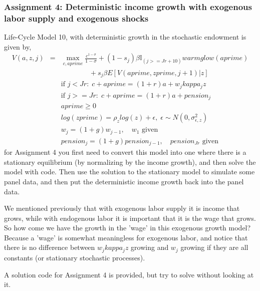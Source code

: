 \subsubsection{Assignment 4: Deterministic income growth with exogenous labor supply and exogenous shocks}
Life-Cycle Model 10, with deterministic growth in the stochastic endowment is given by,
\begin{eqnarray*}
 V(a,z,j)&=& \max_{c,aprime} \frac{c^{1-\sigma}}{1-\sigma}+ (1-s_j)\beta  \mathbb{I}_{(j>=Jr+10)} warmglow(aprime)    \\
 && \quad \quad  \quad \quad  + s_j \beta E[V(aprime,zprime,j+1)|z] \\
&& \text{if }j<Jr: \; c+aprime=(1+r)a+w_j kappa_j z\\
&& \text{if }j>=Jr: \; c+aprime=(1+r)a +pension_j \\
&& aprime\geq 0 \\
&& log(zprime)=\rho_z log(z) + \epsilon, \; \epsilon \sim N(0,\sigma_{\epsilon,z}^2) \\
&& w_j=(1+g) w_{j-1}, \quad w_1\text{ given} \\
&& pension_j=(1+g)pension_{j-1}, \quad pension_{Jr}\text{ given}
\end{eqnarray*}
for Assignment 4 you first need to convert this model into one where there is a stationary equilibrium (by normalizing by the income growth), and then solve the model with code. Then use the solution to the stationary model to simulate some panel data, and then put the deterministic income growth back into the panel data.

We mentioned previously that with exogenous labor supply it is income that grows, while with endogenous labor it is important that it is the wage that grows. So how come we have the growth in the 'wage' in this exogenous growth model? Because a 'wage' is somewhat meaningless for exogenous labor, and notice that there is no difference between $w_j kappa_j z$ growing and $w_j$ growing if they are all constants (or stationary stochastic processes).

A solution code for Assignment 4 is provided, but try to solve without looking at it.


